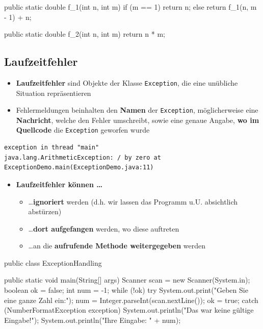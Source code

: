 \documentclass[a4paper,10pt, dvipsnames]{report}
\begin{document}
\begin{javacodebox}
public static double f_1(int n, int m) {
    if (m == 1)
        return n;
    else
        return f_1(n, m - 1) + n;
}

public static double f_2(int n, int m) {
    return n * m;
}
\end{javacodebox}

\subsection{Laufzeitfehler}

\begin{itemize}
    \item \textbf{Laufzeitfehler} sind Objekte der Klasse \texttt{Exception}, die eine unübliche Situation repräsentieren
    \item Fehlermeldungen beinhalten den \textbf{Namen} der \texttt{Exception}, möglicherweise eine \textbf{Nachricht}, welche den Fehler umschreibt, sowie eine genaue Angabe, \textbf{wo im Quellcode} die \texttt{Exception} geworfen wurde
\end{itemize}

\begin{verbatim}
exception in thread "main"
java.lang.ArithmeticException: / by zero at
ExceptionDemo.main(ExceptionDemo.java:11)
\end{verbatim}

\begin{itemize}
    \item \textbf{Laufzeitfehler können \ldots}
    \begin{itemize}
        \item \ldots \textbf{ignoriert} werden (d.h. wir lassen das Programm u.U. absichtlich abstürzen)
        \item \ldots \textbf{dort aufgefangen} werden, wo diese auftreten
        \item \ldots an die \textbf{aufrufende Methode weitergegeben} werden
    \end{itemize}
\end{itemize}

\begin{javacodebox}
public class ExceptionHandling {

    public static void main(String[] args) {
        Scanner scan = new Scanner(System.in);
        boolean ok = false;
        int num = -1;
        while (!ok) {
            try {
                System.out.print("Geben Sie eine ganze Zahl ein:");
                num = Integer.parseInt(scan.nextLine());
                ok = true;
            } catch (NumberFormatException exception) {
                System.out.println("Das war keine gültige Eingabe!");
            }
        }
        System.out.println("Ihre Eingabe: " + num);
    }
}
\end{javacodebox}
\end{document}
